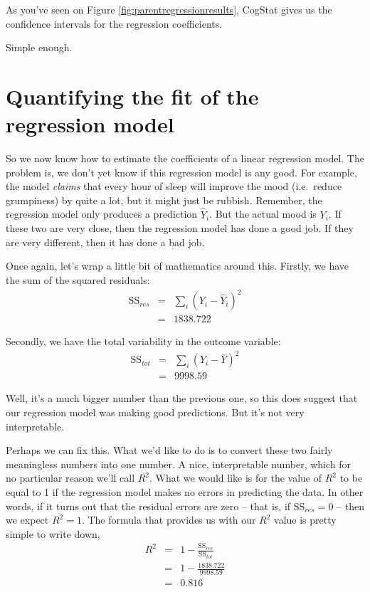\documentclass[
  11pt,
  a4paper,
  twoside,symmetric,openright]{book}
\theoremstyle{break}
\theoremstyle{break}
\begin{document}
As you've seen on Figure \ref{fig:parentregressionresults}, CogStat gives us the confidence intervals for the regression coefficients.

Simple enough.

\section{Quantifying the fit of the regression model}\label{r2}

So we now know how to estimate the coefficients of a linear regression model. The problem is, we don't yet know if this regression model is any good. For example, the model \emph{claims} that every hour of sleep will improve the mood (i.e.~reduce grumpiness) by quite a lot, but it might just be rubbish. Remember, the regression model only produces a prediction \(\hat{Y}_i\). But the actual mood is \(Y_i\). If these two are very close, then the regression model has done a good job. If they are very different, then it has done a bad job.

Once again, let's wrap a little bit of mathematics around this. Firstly, we have the sum of the squared residuals:
\[
\begin{array}{rcl}
\mbox{SS}_{res} &=& \sum_i (Y_i - \hat{Y}_i)^2
    \\
    &=& 1838.722
\end{array}
\]

Secondly, we have the total variability in the outcome variable:
\[
\begin{array}{rcl}
\mbox{SS}_{tot} &=& \sum_i (Y_i - \bar{Y})^2
    \\
    &=&  9998.59
\end{array}
\]

Well, it's a much bigger number than the previous one, so this does suggest that our regression model was making good predictions. But it's not very interpretable.

Perhaps we can fix this. What we'd like to do is to convert these two fairly meaningless numbers into one number. A nice, interpretable number, which for no particular reason we'll call \(R^2\). What we would like is for the value of \(R^2\) to be equal to 1 if the regression model makes no errors in predicting the data. In other words, if it turns out that the residual errors are zero -- that is, if \(\mbox{SS}_{res} = 0\) -- then we expect \(R^2 = 1\). The formula that provides us with our \(R^2\) value is pretty simple to write down,
\[
\begin{array}{rcl}
R^2 &=& 1 - \frac{\mbox{SS}_{res}}{\mbox{SS}_{tot}}
    \\
    &=& 1 - \frac{1838.722}{9998.59}
    \\
    &=& 0.816
\end{array}
\]
\end{document}

